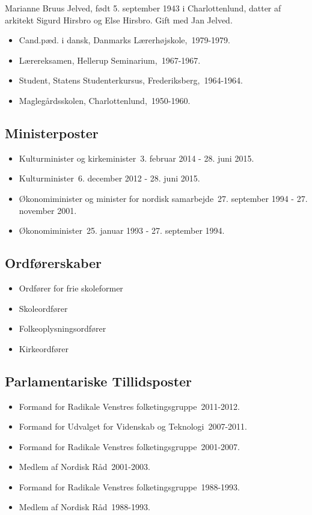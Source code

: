 \documentclass[11pt, a4paper]{awesome-cv}
\begin{document}
\makecvheader[R]
\makelettertitle
\begin{cvletter}
Marianne Bruus Jelved, født 5. september 1943 i Charlottenlund, datter af arkitekt Sigurd Hirsbro og Else Hirsbro. Gift med Jan Jelved. 

\begin{itemize}
\item Cand.pæd. i dansk, Danmarks Lærerhøjskole, 1979-1979.
\item Lærereksamen, Hellerup Seminarium, 1967-1967.
\item Student, Statens Studenterkursus, Frederiksberg, 1964-1964.
\item Maglegårdsskolen, Charlottenlund, 1950-1960.
\end{itemize}
\subsection*{Ministerposter}
\begin{itemize}
\item Kulturminister og kirkeminister 3. februar 2014 - 28. juni 2015.
\item Kulturminister 6. december 2012 - 28. juni 2015.
\item Økonomiminister og minister for nordisk samarbejde 27. september 1994 - 27. november 2001.
\item Økonomiminister 25. januar 1993 - 27. september 1994.
\end{itemize}
\subsection*{Ordførerskaber}
\begin{itemize}
\item Ordfører for frie skoleformer
\item Skoleordfører
\item Folkeoplysningsordfører
\item Kirkeordfører
\end{itemize}
\subsection*{Parlamentariske Tillidsposter}
\begin{itemize}
\item Formand for Radikale Venstres folketingsgruppe 2011-2012.
\item Formand for Udvalget for Videnskab og Teknologi 2007-2011.
\item Formand for Radikale Venstres folketingsgruppe 2001-2007.
\item Medlem af Nordisk Råd 2001-2003.
\item Formand for Radikale Venstres folketingsgruppe 1988-1993.
\item Medlem af Nordisk Råd 1988-1993.
\end{itemize}

\end{cvletter}
\end{document}
